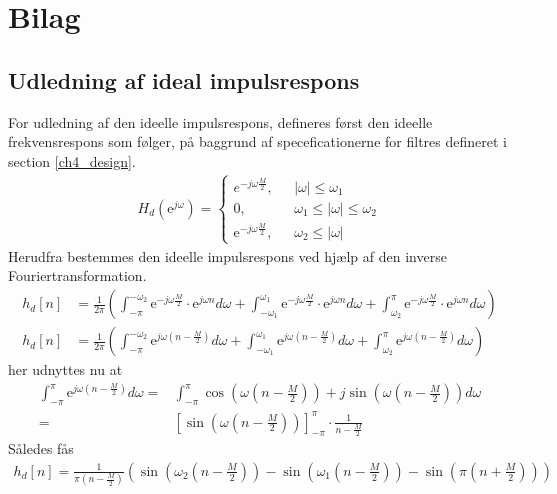 \chapter{Bilag}\label{app1}
\section{Udledning af ideal impulsrespons}
For udledning af den ideelle impulsrespons, defineres først den ideelle frekvensrespons som følger, på baggrund af speceficationerne for filtres defineret i section \ref{ch4_design}.
\begin{align}
 H_d(\text{e}^{j\omega})= \begin{cases}
  {e}^{-j\omega\frac{M}{2}}, \ \ \ & |\omega| \leq\omega_1 \\
 0, \ \ \ & \omega_1 \leq |\omega| \leq \omega_2 \\
  \text{e}^{-j\omega\frac{M}{2}}, \ \ \ & \omega_2 \leq |\omega| 
\end{cases}
\end{align}  
Herudfra bestemmes den ideelle impulsrespons ved hjælp af den inverse Fouriertransformation.  
\begin{align}
h_d[n] &= \frac{1}{2\pi} \left(  \int_{-\pi}^{-\omega_2} \text{e}^{-j\omega \frac{M}{2}} \cdot \text{e}^{j \omega n} d\omega + \int_{-\omega_1}^{\omega_1} \text{e}^{-j\omega \frac{M}{2}} \cdot \text{e}^{j \omega n} d\omega +\int_{\omega_2}^{\pi} \text{e}^{-j\omega \frac{M}{2}} \cdot \text{e}^{j \omega n} d\omega	\right) \\
h_d[n] &= \frac{1}{2\pi} \left(  \int_{-\pi}^{-\omega_2} \text{e}^{j\omega \left(n- \frac{M}{2} \right) } d\omega + \int_{-\omega_1}^{\omega_1} \text{e}^{j\omega \left(n- \frac{M}{2} \right) }  d\omega +\int_{\omega_2}^{\pi} \text{e}^{j\omega \left( n-\frac{M}{2} \right) } d\omega	\right)
\end{align} 
her udnyttes nu at
\begin{align}
\int_{-\pi}^{\pi} \text{e}^{j\omega \left(n- \frac{M}{2} \right) }  d\omega =& \int_{-\pi}^{\pi} \cos\left( \omega \left(n-\frac{M}{2}\right)\right)+j \sin \left( \omega \left(n-\frac{M}{2}\right) \right) d\omega \\
=& \left[ \sin\left(\omega \left(n-\frac{M}{2}\right)\right) \right]_{-\pi}^{\pi} \cdot \frac{1}{n- \frac{M}{2}}
\end{align}    
Således fås 
\begin{align}
h_d[n]= \frac{1}{\pi \left(n-\frac{M}{2}\right)} \left(\sin\left(\omega_2 \left(n-\frac{M}{2}\right)\right) - \sin\left(\omega_1 \left(n-\frac{M}{2}\right)\right) - \sin\left( \pi\left( n + \frac{M}{2} \right) \right) \right)
\end{align}
